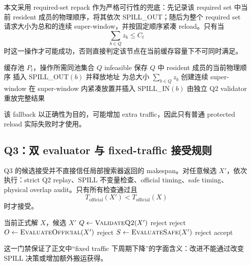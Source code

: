 本文采用 required-set repack 作为严格可行性的兜底：先记录该 required set 中当前 resident 成员的物理顺序，将其依次 SPILL\_OUT；随后为整个 required set 请求大小为总和的连续 super-window，并按固定顺序紧凑 reload。只有当
\[
\sum_{b\in Q} z_b\le C_t
\]
时这一操作才可能成功，否则直接判定该节点在当前缓存容量下不可同时满足。

\begin{algorithm}[H]
\caption{Q2 同池 required-set repack}
\begin{algorithmic}[1]
\Require 缓存池 $P_t$，操作所需同池集合 $Q$
    \State \Return infeasible
\EndIf
\State 保存 $Q$ 中 resident 成员的当前物理顺序
    \State 插入 SPILL\_OUT$(b)$ 并释放地址
\EndFor
\State 为总大小 $\sum_{b\in Q}z_b$ 创建连续 super-window
    \State 在 super-window 内紧凑放置并插入 SPILL\_IN$(b)$
\EndFor
\State 由独立 Q2 validator 重放完整结果
\end{algorithmic}
\end{algorithm}

该 fallback 以正确性为目的，可能增加 extra traffic，因此只有普通 protected reload 实际失败时才使用。

\subsection{Q3：双 evaluator 与 fixed-traffic 接受规则}

Q3 的候选接受并不直接信任局部搜索器返回的 makespan。对任意候选 $X'$，依次执行：strict Q2 replay、SPILL 不变量检查、official timing、safe timing、physical overlap audit。只有所有检查通过且
\[
T_{\mathrm{official}}(X')<T_{\mathrm{official}}(X)
\]
时才接受。

\begin{algorithm}[H]
\caption{Q3 fixed-traffic 候选的严格接受门禁}
\begin{algorithmic}[1]
\Require 当前正式解 $X$，候选 $X'$
\State $Q\gets\textsc{ValidateQ2}(X')$
 \State \Return reject \EndIf
{}
    \State \Return reject
\EndIf
\State $O\gets\textsc{EvaluateOfficial}(X')$
    \State \Return reject
\EndIf
\State $S\gets\textsc{EvaluateSafe}(X')$
    \State \Return reject
\EndIf
\State \Return accept
\end{algorithmic}
\end{algorithm}

这一门禁保证了正文中“fixed traffic 下周期下降”的字面含义：改进不能通过改变 SPILL 决策或增加额外搬运获得。
